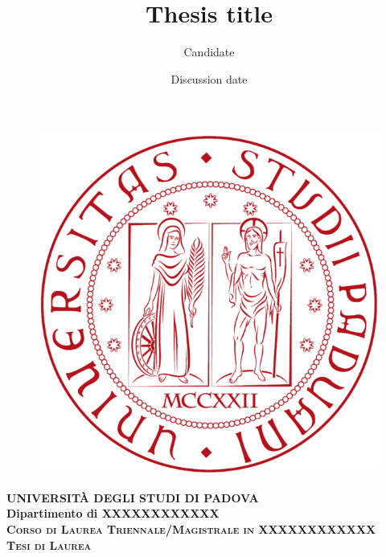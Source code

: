 \documentclass[a4paper,12pt]{memoir} %
\title{Thesis title}
\author{Candidate}
\date{Discussion date}
\begin{document}
  \frontmatter
  \begin{titlingpage} %
    \vspace{5mm}
    \begin{figure}[ht]
      \centering
      \includegraphics[scale=.13]{logo.png}
    \end{figure}
    \vspace{5mm}
    \begin{center}
      {{\Large{\textsc{\textbf{UNIVERSITÀ DEGLI STUDI DI PADOVA}}}}\\}
      \vspace{5mm}
      {\textbf{Dipartimento di XXXXXXXXXXXX}} \\ %
      \vspace{5mm}
      {\textsc{\textbf{Corso di Laurea Triennale/Magistrale in XXXXXXXXXXXX}}}\\ %
      \vspace{20mm}
      {\textsc{\textbf{Tesi di Laurea}}}\\ %
      \vspace{25mm}
      \begin{Spacing}{3}
        {\Large \textbf{\thetitle}}\\
      \end{Spacing}
      \vspace{8mm}
    \end{center}


\end{titlingpage}
\end{document}
